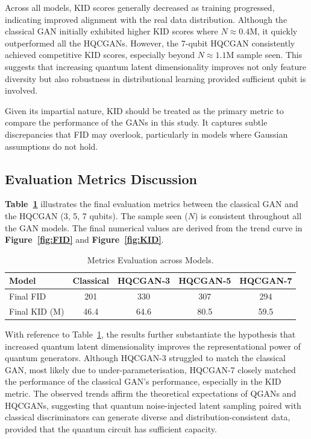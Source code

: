Across all models, KID scores generally decreased as training progressed, indicating improved alignment with the real data distribution. Although the classical GAN initially exhibited higher KID scores where $N \approx 0.4$M, it quickly outperformed all the HQCGANs. However, the 7-qubit HQCGAN consistently achieved competitive KID scores, especially beyond $N \approx 1.1$M sample seen. This suggests that increasing quantum latent dimensionality improves not only feature diversity but also robustness in distributional learning provided sufficient qubit is involved.

Given its impartial nature, KID should be treated as the primary metric to compare the performance of the GANs in this study. It captures subtle discrepancies that FID may overlook, particularly in models where Gaussian assumptions do not hold.

\subsection{Evaluation Metrics Discussion}

\textbf{Table~\ref{tab:metrics_evaluation}} illustrates the final evaluation metrics between the classical GAN and the HQCGAN (3, 5, 7 qubits). The sample seen ($N$) is consistent throughout all the GAN models. The final numerical values are derived from the trend curve in \textbf{Figure~\ref{fig:FID}} and \textbf{Figure~\ref{fig:KID}}.

\begin{table}[h]
  \centering
  \begin{tabular}{|l|c|c|c|c|}
    \hline
    Model & Classical & HQCGAN-3 & HQCGAN-5 & HQCGAN-7 \\ \hline
    Final FID & 201 & 330 & 307 & 294 \\ \hline
    Final KID (M) & 46.4 & 64.6 & 80.5 & 59.5 \\ \hline
  \end{tabular}
  \caption{Metrics Evaluation across Models.}
  \label{tab:metrics_evaluation}
\end{table}

With reference to Table~\ref{tab:metrics_evaluation}, the results further substantiate the hypothesis that increased quantum latent dimensionality improves the representational power of quantum generators. Although HQCGAN-3 struggled to match the classical GAN, most likely due to under-parameterisation, HQCGAN-7 closely matched the performance of the classical GAN’s performance, especially in the KID metric. The observed trends affirm the theoretical expectations of QGANs and HQCGANs, suggesting that quantum noise-injected latent sampling paired with classical discriminators can generate diverse and distribution-consistent data, provided that the quantum circuit has sufficient capacity.

